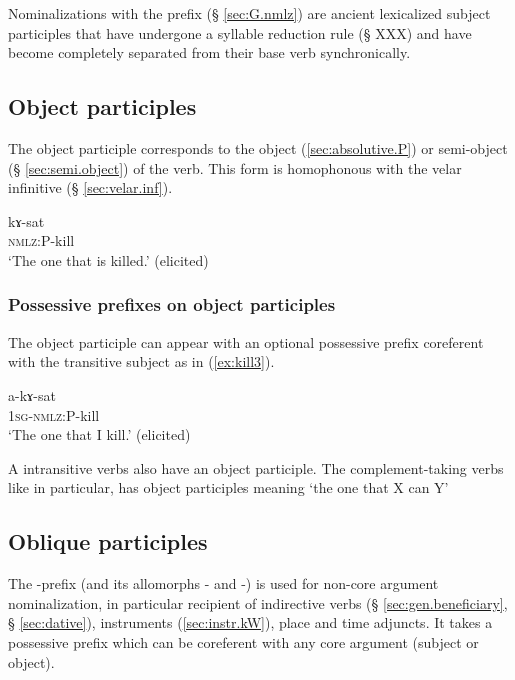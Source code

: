 Nominalizations with the  prefix (§ \ref{sec:G.nmlz}) are ancient lexicalized subject participles that have undergone a syllable reduction rule (§ XXX) and have become completely separated from their base verb synchronically.

\subsection{Object participles}
The object participle corresponds to the object (\ref{sec:absolutive.P}) or semi-object (§ \ref{sec:semi.object}) of the verb. This form is homophonous with the velar infinitive (§ \ref{sec:velar.inf}).

 \begin{exe} 
\ex \label{ex:kill2}
\gll kɤ-sat    \\
   \textsc{nmlz}:P-kill \\
 \glt  `The one that is killed.' (elicited)
 \end{exe}
 
\subsubsection{Possessive prefixes on object participles}  \label{ex:object.participle.possessive} 
 
The object participle can appear with an optional possessive prefix coreferent with the transitive subject as in (\ref{ex:kill3}).
  
  \begin{exe}
\ex \label{ex:kill3}
\gll a-kɤ-sat    \\
   \textsc{1sg-nmlz}:P-kill \\
 \glt  `The one that I kill.' (elicited)
 \end{exe}


A intransitive verbs also have an object participle. The complement-taking verbs like  in particular, has object participles meaning `the one that X can Y'

\subsection{Oblique participles}
The -prefix (and its allomorphs - and -) is used for non-core argument nominalization, in particular recipient of indirective verbs (§ \ref{sec:gen.beneficiary}, § \ref{sec:dative}), instruments (\ref{sec:instr.kW}), place and time adjuncts. It takes a possessive prefix which can be coreferent with any core argument (subject or object).

